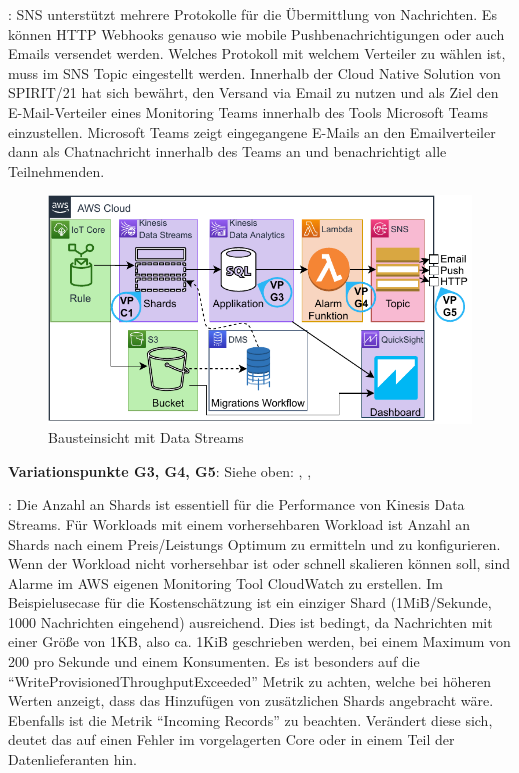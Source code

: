 : \ac{SNS} unterstützt mehrere Protokolle für die Übermittlung von Nachrichten. Es können HTTP Webhooks genauso wie mobile Pushbenachrichtigungen oder auch Emails versendet werden. Welches Protokoll mit welchem Verteiler zu wählen ist, muss im \ac{SNS} Topic eingestellt werden. Innerhalb der Cloud Native Solution von SPIRIT/21 hat sich bewährt, den Versand via Email zu nutzen und als Ziel den E-Mail-Verteiler eines Monitoring Teams innerhalb des Tools Microsoft Teams einzustellen. Microsoft Teams zeigt eingegangene E-Mails an den Emailverteiler dann als Chatnachricht innerhalb des Teams an und benachrichtigt alle Teilnehmenden.

\begin{figure}[H]
\centering
\includegraphics[width=\textwidth]{graphics/Echtzeit-RA-Elements.pdf}
\caption{Bausteinsicht mit Data Streams}
\label{abb:ElementeEchtzeitRAStreams}
\end{figure}
\textbf{Variationspunkte G3, G4, G5}: Siehe oben: , , 

: Die Anzahl an Shards ist essentiell für die Performance von Kinesis Data Streams. Für Workloads mit einem vorhersehbaren Workload ist Anzahl an Shards nach einem Preis/Leistungs Optimum zu ermitteln und zu konfigurieren. Wenn der Workload nicht vorhersehbar ist oder schnell skalieren können soll, sind Alarme im AWS eigenen Monitoring Tool CloudWatch zu erstellen. Im Beispielusecase für die Kostenschätzung ist ein einziger Shard (1MiB/Sekunde, 1000 Nachrichten eingehend) ausreichend. Dies ist bedingt, da Nachrichten mit einer Größe von 1KB, also ca. 1KiB geschrieben werden, bei einem Maximum von 200 pro Sekunde und einem Konsumenten. Es ist besonders auf die \enquote{WriteProvisionedThroughputExceeded} Metrik zu achten, welche bei höheren Werten anzeigt, dass das Hinzufügen von zusätzlichen Shards angebracht wäre. Ebenfalls ist die Metrik \enquote{Incoming Records} zu beachten. Verändert diese sich, deutet das auf einen Fehler im vorgelagerten \AWSIOT{} Core oder in einem Teil der Datenlieferanten hin.

